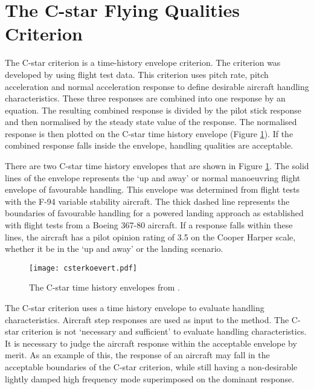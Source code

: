 \documentclass{report}
\begin{document}
\section{The C-star Flying Qualities Criterion}\label{Sec: C-star}


The C-star criterion \citep{CstarCriterion} is a time-history envelope criterion.  The criterion was developed by using flight test data.  This criterion uses pitch rate, pitch acceleration and normal acceleration response to define desirable aircraft handling characteristics.  These three responses are combined into one response by an equation.  The resulting combined response is divided by the pilot stick response and then normalised by the steady state value of the response.  The normalised response is then plotted on the C-star time history envelope (Figure \ref{Fig: CstarTimeHistoryEnvelopes}).  If the combined response falls inside the envelope, handling qualities are acceptable.

There are two C-star time history envelopes that are shown in Figure \ref{Fig: CstarTimeHistoryEnvelopes}.  The solid lines of the envelope represents the `up and away' or normal manoeuvring flight envelope of favourable handling.  This envelope was determined from flight tests with the F-94  variable stability aircraft.   The thick dashed line represents the boundaries of favourable handling for a powered landing approach as established with flight tests from a Boeing 367-80 aircraft.  If a response falls within these lines, the aircraft has a pilot opinion rating of 3.5 on the Cooper Harper scale, whether it be in the `up and away' or the landing scenario.

\begin{figure}[htb]
	\begin{center}
		\texttt{[image: csterkoevert.pdf]}
	\end{center}
	\caption{The C-star time history envelopes from \cite{CstarCriterion}.}
	\label{Fig: CstarTimeHistoryEnvelopes}
\end{figure}

The C-star criterion uses a time history envelope to evaluate handling characteristics.  Aircraft step responses are used as input to the method.  The C-star criterion is not `necessary and sufficient' to evaluate handling characteristics.  It is necessary to judge the aircraft response within the acceptable envelope by merit.  As an example of this, the response of an aircraft may fall in the acceptable boundaries of the C-star criterion, while still having a non-desirable lightly damped high frequency mode superimposed on the dominant response.
\end{document}
